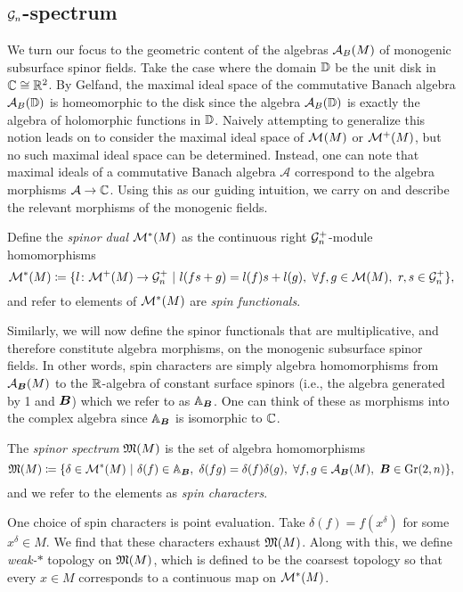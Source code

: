 \subsection{$\mathcal{G}_n$-spectrum}

We turn our focus to the geometric content of the algebras $\mathcal{A}_{B}(M)$ of monogenic subsurface spinor fields. Take the case where the domain $\mathbb{D}$ be the unit disk in $\mathbb{C} \cong \mathbb{R}^2$.  By Gelfand, the maximal ideal space of the commutative Banach algebra $\mathcal{A}_{B}(\mathbb{D})$ is homeomorphic to the disk since the algebra $\mathcal{A}_{B}(\mathbb{D})$ is exactly the algebra of holomorphic functions in $\mathbb{D}$. Naively attempting to generalize this notion leads on to consider the maximal ideal space of $\mathcal{M}^{}(M)$ or $\mathcal{M}^{+}(M)$, but no such maximal ideal space can be determined. Instead, one can note that maximal ideals of a commutative Banach algebra $\mathcal{A}$ correspond to the algebra morphisms $\mathcal{A} \to \mathbb{C}$.  Using this as our guiding intuition, we carry on and describe the relevant morphisms of the monogenic fields.

\begin{definition}
    Define the \emph{spinor dual} $\mathcal{M}^*(M)$ as the continuous right $\mathcal{G}_n^+$-module homomorphisms
    \begin{equation}
        \mathcal{M}^*(M) \coloneqq \{ l \colon \mathcal{M}^+(M) \to \mathcal{G}_n^+ ~\vert~ l(fs+g) = l(f)s+l(g), ~\forall f,g \in \mathcal{M}(M), ~r,s \in \mathcal{G}_n^+ \},
    \end{equation}
    and refer to elements of $\mathcal{M}^*(M)$ are \emph{spin functionals}.
\end{definition}
Similarly, we will now define the spinor functionals that are multiplicative, and therefore constitute algebra morphisms, on the monogenic subsurface spinor fields. In other words, spin characters are simply algebra homomorphisms from $\mathcal{A}_{\boldsymbol{B}}(M)$ to the $\mathbb{R}$-algebra of constant surface spinors (i.e., the algebra generated by 1 and $\boldsymbol{B}$) which we refer to as $\mathbb{A}_{\boldsymbol{B}}$. One can think of these as morphisms into the complex algebra since $\mathbb{A}_{\boldsymbol{B}}$ is isomorphic to $\mathbb{C}$.
\begin{definition}
    The \emph{spinor spectrum} $\mathfrak{M}(M)$ is the set of algebra homomorphisms
    \[
        \mathfrak{M}(M) \coloneqq \{ \delta \in \mathcal{M}^*(M) ~\vert~ \delta(f) \in \mathbb{A}_{\boldsymbol{B}},~\delta(fg) = \delta(f)\delta(g),~ \forall f,g \in \mathcal{A}_{\boldsymbol{B}}(M),~  \boldsymbol{B} \in \operatorname{Gr}(2,n)\},
    \]
    and we refer to the elements as \emph{spin characters}.
\end{definition}
One choice of spin characters is point evaluation. Take $\delta(f)=f(x^\delta)$ for some $x^\delta \in M$. We find that these characters exhaust $\mathfrak{M}(M)$. Along with this, we define \emph{weak-$\ast$} topology on $\mathfrak{M}(M)$, which is defined to be the coarsest topology so that every $x \in M$ corresponds to a continuous map on $\mathcal{M}^*(M)$. 

